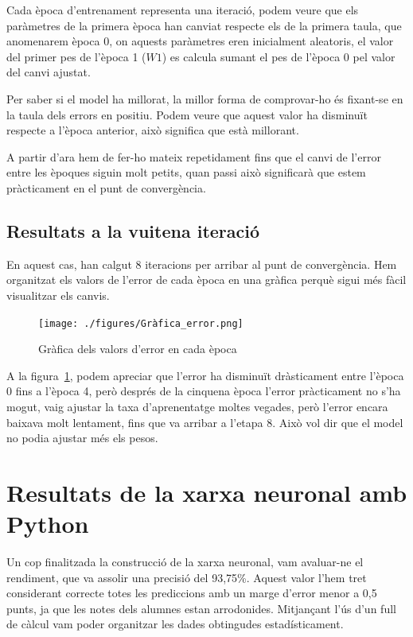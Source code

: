Cada època d'entrenament representa una iteració, podem veure que els paràmetres de la primera època han canviat respecte els de la primera taula, que anomenarem època 0, on aquests paràmetres eren inicialment aleatoris, el valor del primer pes de l'època 1 ($W1$) es calcula sumant el pes de l'època 0 pel valor del canvi ajustat.

Per saber si el model ha millorat, la millor forma de comprovar-ho és fixant-se en la taula dels errors en positiu. Podem veure que aquest valor ha disminuït respecte a l'època anterior, això significa que està millorant.

A partir d'ara hem de fer-ho mateix repetidament fins que el canvi de l'error entre les èpoques siguin molt petits, quan passi això significarà que estem pràcticament en el punt de convergència.%
\clearpage
\subsection{Resultats a la vuitena iteració}
En aquest cas, han calgut 8 iteracions per arribar al punt de convergència. Hem organitzat els valors de l'error de cada època en una gràfica perquè sigui més fàcil visualitzar els canvis.


\begin{figure}[h!]
    \centering
    \texttt{[image: ./figures/Gràfica\_error.png]}
    \caption{Gràfica dels valors d'error en cada època}
    \label{f:errorsEpoca}
\end{figure}


A la figura~\ref{f:errorsEpoca}, podem apreciar que l'error ha disminuït dràsticament entre l'època 0 fins a l'època 4, però després de la cinquena època l'error pràcticament no s'ha mogut, vaig ajustar la taxa d'aprenentatge moltes vegades, però l'error encara baixava molt lentament, fins que va arribar a l'etapa 8. Això vol dir que el model no podia ajustar més els pesos.


\section{Resultats de la xarxa neuronal amb Python}

Un cop finalitzada la construcció de la xarxa neuronal, vam avaluar-ne el rendiment, que va assolir una precisió del 93,75\%. Aquest valor l'hem tret considerant correcte totes les prediccions amb un marge d'error menor a 0,5 punts, ja que les notes dels alumnes estan arrodonides. Mitjançant l’ús d’un full de càlcul vam poder organitzar les dades obtingudes estadísticament.

